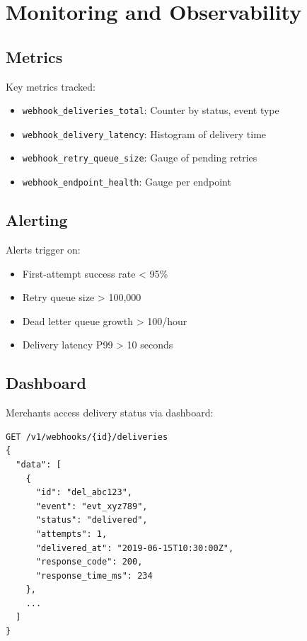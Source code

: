 \section{Monitoring and Observability}


\subsection{Metrics}

Key metrics tracked:

\begin{itemize}
    \item \texttt{webhook\_deliveries\_total}: Counter by status, event type
    \item \texttt{webhook\_delivery\_latency}: Histogram of delivery time
    \item \texttt{webhook\_retry\_queue\_size}: Gauge of pending retries
    \item \texttt{webhook\_endpoint\_health}: Gauge per endpoint
\end{itemize}

\subsection{Alerting}

Alerts trigger on:

\begin{itemize}
    \item First-attempt success rate < 95\%
    \item Retry queue size > 100,000
    \item Dead letter queue growth > 100/hour
    \item Delivery latency P99 > 10 seconds
\end{itemize}

\subsection{Dashboard}

Merchants access delivery status via dashboard:

\begin{lstlisting}[caption=Delivery Status API]
GET /v1/webhooks/{id}/deliveries
{
  "data": [
    {
      "id": "del_abc123",
      "event": "evt_xyz789",
      "status": "delivered",
      "attempts": 1,
      "delivered_at": "2019-06-15T10:30:00Z",
      "response_code": 200,
      "response_time_ms": 234
    },
    ...
  ]
}
\end{lstlisting}

